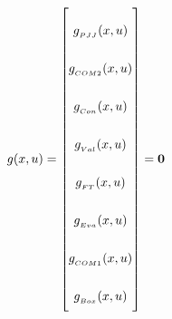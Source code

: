 \begin{equation} \label{eq:Gtotal}\renewcommand{\arraystretch}{2.5}
	g(x,u) =  \begin{bmatrix}
		g_{_{PJJ}}(x,u)  		 	\\ %
		g_{_{COM2}}(x,u)				\\ %
		g_{_{Con}}(x,u)			\\ %
		g_{_{Val}}(x,u)			\\ %
		g_{_{FT}}(x,u)		\\ %
		g_{_{Eva}}(x,u)		\\ %
		g_{_{COM1}}(x,u)			\\
		g_{_{Box}}(x,u)			\\
	\end{bmatrix}
	= \textbf{0}
\end{equation}



